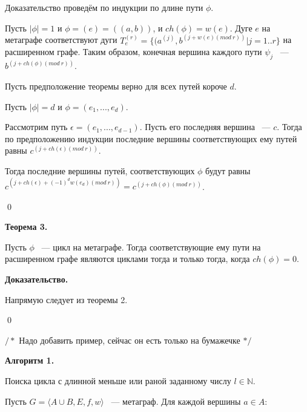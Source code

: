 \documentclass[14pt]{mmcs-article}
\begin{document}


Доказательство проведём по индукции по длине пути $\phi$.

Пусть $|\phi| = 1$ и  $\phi = (e) = ((a,b))$, и $ch(\phi) = w(e)$. Дуге $e$ на метаграфе соответствуют дуги $T^{(r)}_e = \{ (a^{(j)}, b^{(j + w(e) (mod\ r))} | j = 1..r \}$ на расширенном графе. Таким образом, конечная вершина каждого пути $\psi_j$ ~--- $b^{(j + ch(\phi) (mod\ r))}$.

Пусть предположение теоремы верно для всех путей короче $d$.

Пусть $|\phi| = d$ и $\phi = (e_1, ..., e_d)$.

Рассмотрим путь $\epsilon = (e_1, ..., e_{d-1})$. Пусть его последняя вершина ~--- $c$. Тогда по предположению индукции последние вершины соответствующих ему путей равны $c^{(j + ch(\epsilon) (mod\ r))}$.

Тогда последние вершины путей, соответствующих $\phi$ будут равны $c^{(j + ch(\epsilon) + (-1)^d w(e_d) (mod\ r))} = c^{(j + ch(\phi) (mod\ r))}$.

\qed

\textbf{Теорема 3.}

Пусть $\phi$ ~--- цикл на метаграфе. Тогда соответствующие ему пути на расширенном графе являются циклами тогда и только тогда, когда $ch(\phi) = 0$.

\textbf{Доказательство.}

Напрямую следует из теоремы 2.

\qed

$/*$ Надо добавить пример, сейчас он есть только на бумажечке $*/$

\textbf{Алгоритм 1.}

Поиска цикла с длинной меньше или раной заданному числу $l \in \mathbb{N}$.

Пусть $G = \langle A \cup B, E,f,w\rangle$ ~--- метаграф. Для каждой вершины $a \in A:$
\end{document}

